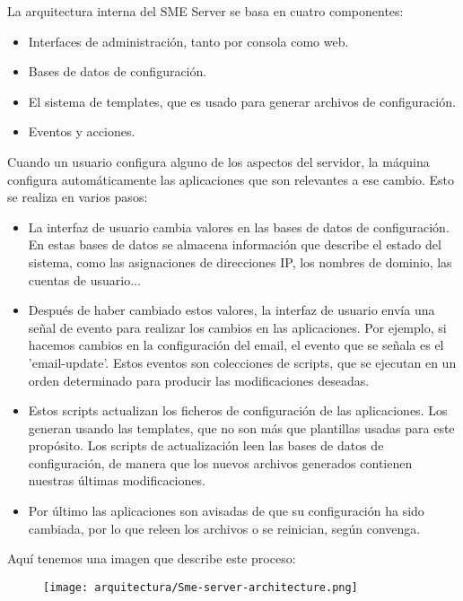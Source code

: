 
La arquitectura interna del SME Server se basa en cuatro componentes:

\begin{itemize}
\item Interfaces de administración, tanto por consola como web.
\item Bases de datos de configuración.
\item El sistema de templates, que es usado para generar archivos de configuración.
\item Eventos y acciones.
\end{itemize}

Cuando un usuario configura alguno de los aspectos del servidor, la máquina configura automáticamente las aplicaciones que son relevantes a ese cambio. Esto se realiza en varios pasos:
\begin{itemize}
\item La interfaz de usuario cambia valores en las bases de datos de configuración. En estas bases de datos se almacena información que describe el estado del sistema, como las asignaciones de direcciones IP, los nombres de dominio, las cuentas de usuario...
\item Después de haber cambiado estos valores, la interfaz de usuario envía una señal de evento para realizar los cambios en las aplicaciones. Por ejemplo, si hacemos cambios en la configuración del email, el evento que se señala es el 'email-update'. Estos eventos son colecciones de scripts, que se ejecutan en un orden determinado para producir las modificaciones deseadas.
\item Estos scripts actualizan los ficheros de configuración de las aplicaciones. Los generan usando las templates, que no son más que plantillas usadas para este propósito. Los scripts de actualización leen las bases de datos de configuración, de manera que los nuevos archivos generados contienen nuestras últimas modificaciones.
\item Por último las aplicaciones son avisadas de que su configuración ha sido cambiada, por lo que releen los archivos o se reinician, según convenga.
\end{itemize}

Aquí tenemos una imagen que describe este proceso:

\begin{figure}[H]
    \centering
    \texttt{[image: arquitectura/Sme-server-architecture.png]}
\end{figure}

